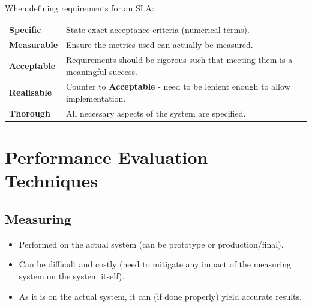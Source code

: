 When defining requirements for an SLA:
\begin{center}
    \begin{tabular}{l p{}}
        \textbf{Specific} & State exact acceptance criteria (numerical terms). \\
        \textbf{Measurable} & Ensure the metrics used can actually be measured. \\
        \textbf{Acceptable} & Requirements should be rigorous such that meeting them is a meaningful success. \\
        \textbf{Realisable} & Counter to \textbf{Acceptable} - need to be lenient enough to allow implementation. \\
        \textbf{Thorough} & All necessary aspects of the system are specified. \\
    \end{tabular}
\end{center}

\section{Performance Evaluation Techniques}
\subsection{Measuring}
\begin{itemize}
    \item Performed on the actual system (can be prototype or production/final).
    \item Can be difficult and costly (need to mitigate any impact of the measuring system on the system itself).
    \item As it is on the actual system, it can (if done properly) yield accurate results.
\end{itemize}


